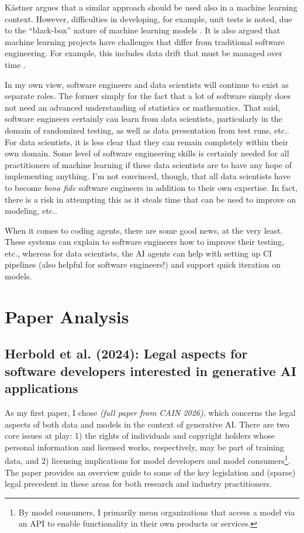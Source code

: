 \documentclass[a4paper,11pt]{article}
\begin{document}
K\"{a}stner argues that a similar approach should be used also in a machine learning context. However, difficulties in developing, for example, unit tests is noted, due to the ``black-box'' nature of machine learning models \cite{kastner2025machine}. It is also argued that machine learning projects have challenges that differ from traditional software engineering. For example, this includes data drift that must be managed over time \cite{kastner2025machine}.

In my own view, software engineers and data scientists will continue to exist as separate roles. The former simply for the fact that a lot of software simply does not need an advanced understanding of statistics or mathematics. That said, software engineers certainly can learn from data scientists, particularly in the domain of randomized testing, as well as data presentation from test runs, etc.. For data scientists, it is less clear that they can remain completely within their own domain. Some level of software engineering skills is certainly needed for all practitioners of machine learning if these data scientists are to have any hope of implementing anything. I'm not convinced, though, that all data scientists have to become \emph{bona fide} software engineers in addition to their own expertise. In fact, there is a risk in attempting this as it steals time that can be used to improve on modeling, etc..

When it comes to coding agents, there are some good news, at the very least. These systems can explain to software engineers how to improve their testing, etc., whereas for data scientists, the AI agents can help with setting up CI pipelines (also helpful for software engineers!) and support quick iteration on models.

\section{Paper Analysis}

\subsection{Herbold et al. (2024): Legal aspects for software developers interested in generative AI applications}

As my first paper, I chose \cite{herbold2024legal} \emph{(full paper from CAIN 2026)}, which concerns the legal aspects of both data and models in the context of generative AI. There are two core issues at play: 1) the rights of individuals and copyright holders whose personal information and licensed works, respectively, may be part of training data, and 2) licensing implications for model developers and model consumers\footnote{By model consumers, I primarily mean organizations that access a model via an API to enable functionality in their own products or services.}. The paper provides an overview guide to some of the key legislation and (sparse) legal precedent in these areas for both research and industry practitioners.
\end{document}
